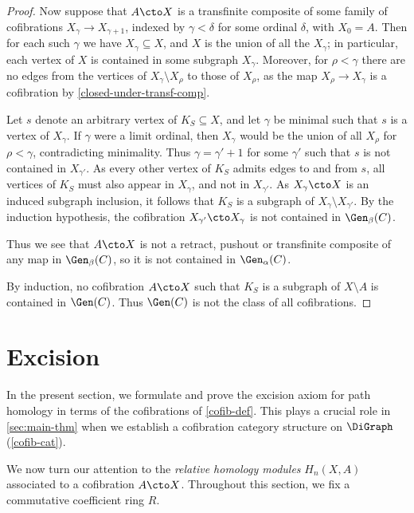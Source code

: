 \begin{proof}
Now suppose that $A \cto X$ is a transfinite composite of some family of cofibrations $X_\gamma \to X_{\gamma + 1}$, indexed by $\gamma < \delta$ for some ordinal $\delta$, with $X_0 = A$. Then for each such $\gamma$ we have $X_\gamma \subseteq X$, and $X$ is the union of all the $X_\gamma$; in particular, each vertex of $X$ is contained in some subgraph $X_\gamma$. Moreover, for $\rho < \gamma$ there are no edges from the vertices of $X_\gamma \setminus X_\rho$ to those of $X_\rho$, as the map $X_\rho \to X_\gamma$ is a cofibration by \cref{closed-under-transf-comp}. 

Let $s$ denote an arbitrary vertex of $K_S \subseteq X$, and let $\gamma$ be minimal such that $s$ is a vertex of $X_\gamma$. If $\gamma$ were a limit ordinal, then $X_\gamma$ would be the union of all $X_\rho$ for $\rho < \gamma$, contradicting minimality. Thus $\gamma = \gamma' + 1$ for some $\gamma'$ such that $s$ is not contained in $X_{\gamma'}$. As every other vertex of $K_S$ admits edges to and from $s$, all vertices of $K_S$ must also appear in $X_\gamma$, and not in $X_{\gamma'}$. As $X_{\gamma} \cto X$ is an induced subgraph inclusion, it follows that $K_S$ is a subgraph of $X_\gamma \setminus X_{\gamma'}$. By the induction hypothesis, the cofibration $X_{\gamma'} \cto X_\gamma$ is not contained in $\Gen_{\beta}(C)$.

Thus we see that $A \cto X$ is not a retract, pushout or transfinite composite of any map in $\Gen_{\beta}(C)$, so it is not contained in $\Gen_{\alpha}(C)$.

By induction, no cofibration $A \cto X$ such that $K_S$ is a subgraph of $X \setminus A$ is contained in $\Gen(C)$. Thus $\Gen(C)$ is not the class of all cofibrations.
\end{proof}

\section{Excision} \label{sec:excision}

In the present section, we formulate and prove the excision axiom for path homology in terms of the cofibrations of \cref{cofib-def}.
This plays a crucial role in \cref{sec:main-thm} when we establish a cofibration category structure on $\DiGraph$ (\cref{cofib-cat}).

We now turn our attention to the \emph{relative homology modules} $H_n(X,A)$ associated to a cofibration $A \cto X$.
Throughout this section, we fix a commutative coefficient ring $R$.


